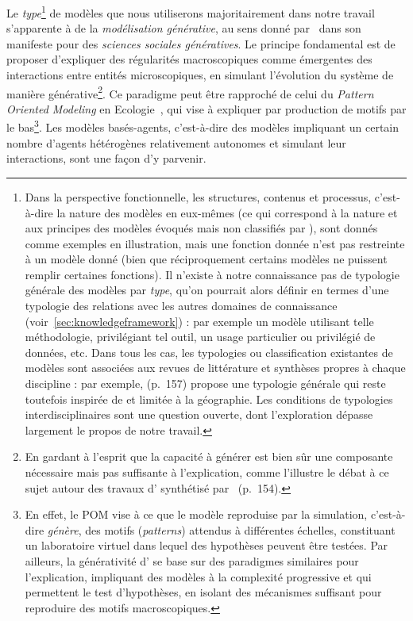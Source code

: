 {}{
Le \emph{type}\footnote{Dans la perspective fonctionnelle, les structures, contenus et processus, c'est-à-dire la nature des modèles en eux-mêmes (ce qui correspond à la nature et aux principes des modèles évoqués mais non classifiés par ), sont donnés comme exemples en illustration, mais une fonction donnée n'est pas restreinte à un modèle donné (bien que réciproquement certains modèles ne puissent remplir certaines fonctions). Il n'existe à notre connaissance pas de typologie générale des modèles par \emph{type}, qu'on pourrait alors définir en termes d'une typologie des relations avec les autres domaines de connaissance (voir~\ref{sec:knowledgeframework}) : par exemple un modèle utilisant telle méthodologie, privilégiant tel outil, un usage particulier ou privilégié de données, etc. Dans tous les cas, les typologies ou classification existantes de modèles sont associées aux revues de littérature et synthèses propres à chaque discipline : par exemple, \cite{harvey1969explanation} (p.~157) propose une typologie générale qui reste toutefois inspirée de et limitée à la géographie. Les conditions de typologies interdisciplinaires sont une question ouverte, dont l'exploration dépasse largement le propos de notre travail.} de modèles que nous utiliserons majoritairement dans notre travail s'apparente à de la \emph{modélisation générative}, au sens donné par~\cite{epstein2006generative} dans son manifeste pour des \emph{sciences sociales génératives}. Le principe fondamental est de proposer d'expliquer des régularités macroscopiques comme émergentes des interactions entre entités microscopiques, en simulant l'évolution du système de manière générative\footnote{En gardant à l'esprit que la capacité à générer est bien sûr une composante nécessaire mais pas suffisante à l'explication, comme l'illustre le débat à ce sujet autour des travaux d' synthétisé par~\cite{rey2015plateforme} (p.~154).}. Ce paradigme peut être rapproché de celui du \emph{Pattern Oriented Modeling} en Ecologie~\cite{grimm2005pattern}, qui vise à expliquer par production de motifs par le bas\footnote{En effet, le POM vise à ce que le modèle reproduise par la simulation, c'est-à-dire \emph{génère}, des motifs (\emph{patterns}) attendus à différentes échelles, constituant un laboratoire virtuel dans lequel des hypothèses peuvent être testées. Par ailleurs, la générativité d' se base sur des paradigmes similaires pour l'explication, impliquant des modèles à la complexité progressive et qui permettent le test d'hypothèses, en isolant des mécanismes suffisant pour reproduire des motifs macroscopiques.}. Les modèles basés-agents, c'est-à-dire des modèles impliquant un certain nombre d'agents hétérogènes relativement autonomes et simulant leur interactions, sont une façon d'y parvenir.
}


